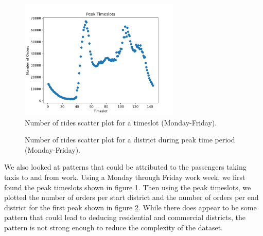 \documentclass[paper=a4, fontsize=11pt]{scrartcl} %
\numberwithin{equation}{section} %
\numberwithin{table}{section} %
\begin{document}
\begin{figure}[!htb]
\centering
\includegraphics[width=3in]{figures/PeakTimeslots.png}
\caption{Number of rides scatter plot for a timeslot (Monday-Friday).}
\label{peak}
\end{figure}

\begin{figure}[!htb]
\centering
{}
\caption{Number of rides scatter plot for a district during peak time period (Monday-Friday).}
\label{peakDistrict}
\end{figure}

We also looked at patterns that could be attributed to the passengers taking taxis to and from work. Using a Monday through Friday work week, we first found the peak timeslots shown in figure \ref{peak}. Then using the peak timeslots, we plotted the number of orders per start district and the number of orders per end district for the first peak shown in figure \ref{peakDistrict}. While there does appear to be some pattern that could lead to deducing residential and commercial districts, the pattern is not strong enough to reduce the complexity of the dataset.\\
\end{document}
